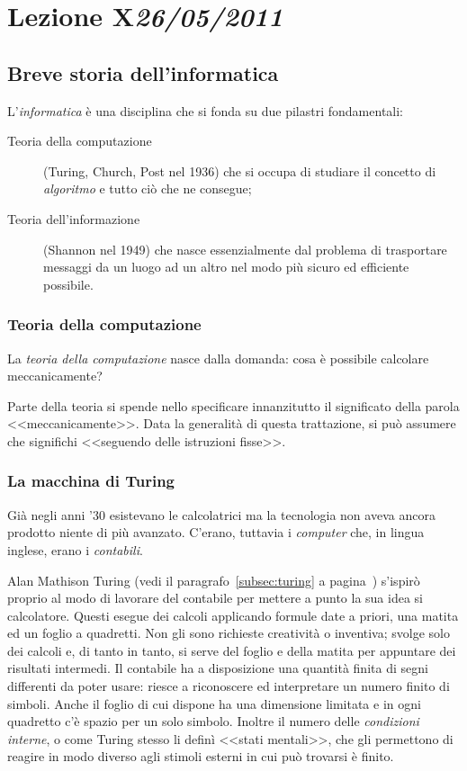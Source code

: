\chapter[Lezione X]{Lezione X\newline\small{\emph{26/05/2011}}}
	\section{Breve storia dell'informatica}
L'\emph{informatica} è una disciplina che si fonda su due pilastri fondamentali:
\begin{description}
	\item[Teoria della computazione] (Turing, Church, Post nel 1936) che si occupa di studiare il concetto di \emph{algoritmo} e tutto ciò che ne consegue;
	\item[Teoria dell'informazione] (Shannon nel 1949) che nasce essenzialmente dal problema di trasportare messaggi da un luogo ad un altro nel modo più sicuro ed efficiente possibile.
\end{description}

		\subsection{Teoria della computazione}
La \emph{teoria della computazione} nasce dalla domanda: cosa è possibile calcolare meccanicamente?

Parte della teoria si spende nello specificare innanzitutto il significato della parola <<meccanicamente>>.
Data la generalità di questa trattazione, si può assumere che significhi <<seguendo delle istruzioni fisse>>.

		\subsection{La macchina di Turing}
		\label{subsec:mturing}
Già negli anni '30 esistevano le calcolatrici ma la tecnologia non aveva ancora prodotto niente di più avanzato.
C'erano, tuttavia i \emph{computer} che, in lingua inglese, erano i \emph{contabili}.

Alan Mathison Turing (vedi il paragrafo~\ref{subsec:turing} a pagina~\pageref{subsec:turing}) s'ispirò proprio al modo di lavorare del contabile per mettere a punto la sua idea si calcolatore.
Questi esegue dei calcoli applicando formule date a priori, una matita ed un foglio a quadretti.
Non gli sono richieste creatività o inventiva; svolge solo dei calcoli e, di tanto in tanto, si serve del foglio e della matita per appuntare dei risultati intermedi.
Il contabile ha a disposizione una quantità finita di segni differenti da poter usare: riesce a riconoscere ed interpretare un numero finito di simboli.
Anche il foglio di cui dispone ha una dimensione limitata e in ogni quadretto c'è spazio per un solo simbolo.
Inoltre il numero delle \emph{condizioni interne}, o come Turing stesso li definì <<stati mentali>>, che gli permettono di reagire in modo diverso agli stimoli esterni in cui può trovarsi è finito.

